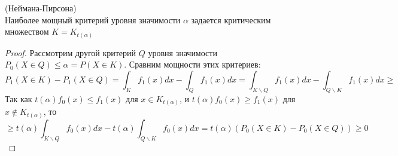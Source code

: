 \begin{theorem} (Неймана-Пирсона) \\
Наиболее мощный критерий уровня значимости $\alpha$ задается критическим множеством $K = K_{t\left(\alpha\right)}$
\end{theorem}
\begin{proof}
Рассмотрим другой критерий $Q$ уровня значимости $P_0\left(X \in Q\right) \leq \alpha = P\left(X \in K\right)$. Сравним мощности этих критериев:
\[
    P_1\left(X \in K\right) - P_1\left(X \in Q\right) = \int_K f_1\left(x\right) dx - \int_Q f_1\left(x\right) dx = \int_{K \backslash Q} f_1\left(x\right) dx - \int_{Q \backslash K} f_1\left(x\right) dx \geq 
\]
Так как $t\left(\alpha\right) f_0\left(x\right) \leq f_1\left(x\right)$ для $x \in K_{t\left(\alpha\right)}$, и $t\left(\alpha\right) f_0\left(x\right) \geq f_1\left(x\right)$ для $x \not\in K_{t\left(\alpha\right)}$, то
\[
    \geq t\left(\alpha\right)\int_{K \backslash Q} f_0\left(x\right) dx - t\left(\alpha\right)\int_{Q \backslash K} f_0\left(x\right) dx = t\left(\alpha\right) \left(P_0\left(X \in K\right) - P_0\left(X \in Q\right)\right) \geq 0
\]
\end{proof}

